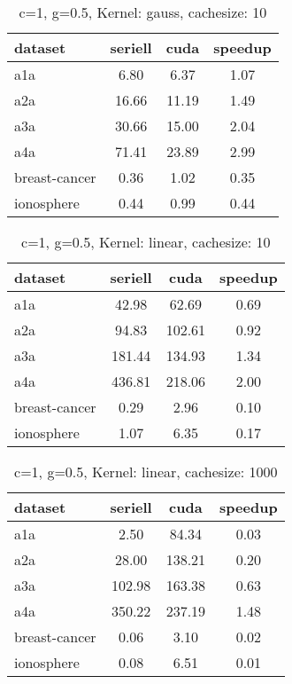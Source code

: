 \documentclass{scrartcl}
\begin{document}
\begin{table}
\begin{center}
\begin{tabular}{|l|c|c|c|}
\hline
dataset & seriell & cuda & speedup \\
\hline
a1a & 6.80 & 6.37 & 1.07 \\
a2a & 16.66 & 11.19 & 1.49 \\
a3a & 30.66 & 15.00 & 2.04 \\
a4a & 71.41 & 23.89 & 2.99 \\
breast-cancer & 0.36 & 1.02 & 0.35 \\
ionosphere & 0.44 & 0.99 & 0.44 \\
\hline
\end{tabular}
\end{center}
\caption{ c=1, g=0.5, Kernel: gauss, cachesize: 10}
\end{table}

\begin{table}
\begin{center}
\begin{tabular}{|l|c|c|c|}
\hline
dataset & seriell & cuda & speedup \\
\hline
a1a & 42.98 & 62.69 & 0.69 \\
a2a & 94.83 & 102.61 & 0.92 \\
a3a & 181.44 & 134.93 & 1.34 \\
a4a & 436.81 & 218.06 & 2.00 \\
breast-cancer & 0.29 & 2.96 & 0.10 \\
ionosphere & 1.07 & 6.35 & 0.17 \\
\hline
\end{tabular}
\end{center}
\caption{ c=1, g=0.5, Kernel: linear, cachesize: 10}
\end{table}

\begin{table}
\begin{center}
\begin{tabular}{|l|c|c|c|}
\hline
dataset & seriell & cuda & speedup \\
\hline
a1a & 2.50 & 84.34 & 0.03 \\
a2a & 28.00 & 138.21 & 0.20 \\
a3a & 102.98 & 163.38 & 0.63 \\
a4a & 350.22 & 237.19 & 1.48 \\
breast-cancer & 0.06 & 3.10 & 0.02 \\
ionosphere & 0.08 & 6.51 & 0.01 \\
\hline
\end{tabular}
\end{center}
\caption{ c=1, g=0.5, Kernel: linear, cachesize: 1000}
\end{table}
\end{document}
